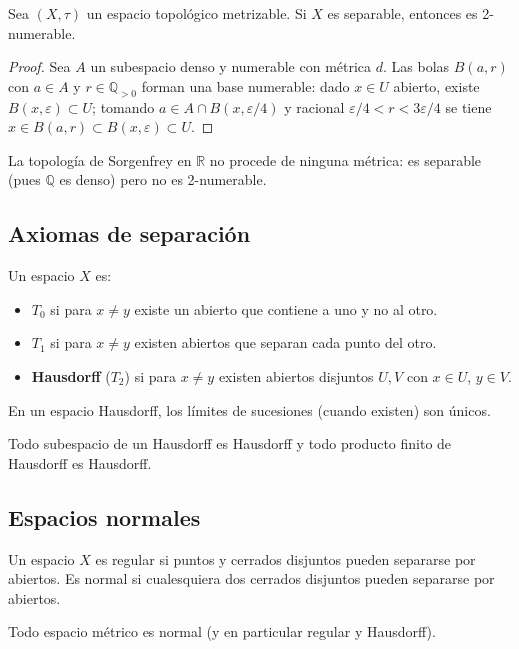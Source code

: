 \begin{proposición}
    Sea $(X, \tau)$ un espacio topológico metrizable. Si $X$ es separable, entonces es 2-numerable.
\end{proposición}
\begin{proof}
    Sea $A$ un subespacio denso y numerable con métrica $d$. Las bolas $B(a, r)$ con $a \in A$ y $r \in \mathbb{Q}_{>0}$ forman una base numerable: dado $x \in U$ abierto, existe $B(x, \varepsilon) \subset U$; tomando $a \in A \cap B(x, \varepsilon/4)$ y racional $\varepsilon/4 < r < 3\varepsilon/4$ se tiene $x \in B(a, r) \subset B(x, \varepsilon) \subset U$.
\end{proof}

\begin{corolario}
    La topología de Sorgenfrey en $\mathbb{R}$ no procede de ninguna métrica: es separable (pues $\mathbb{Q}$ es denso) pero no es 2-numerable.
\end{corolario}


\subsection{Axiomas de separación}

\begin{definición}[$T_0$, $T_1$, Hausdorff]
    Un espacio $X$ es:
    \begin{itemize}
        \item $T_0$ si para $x\neq y$ existe un abierto que contiene a uno y no al otro.
        \item $T_1$ si para $x\neq y$ existen abiertos que separan cada punto del otro.
        \item \textbf{Hausdorff} ($T_2$) si para $x\neq y$ existen abiertos disjuntos $U,V$ con $x\in U$, $y\in V$.
    \end{itemize}
\end{definición}

\begin{proposición}
    En un espacio Hausdorff, los límites de sucesiones (cuando existen) son únicos.
\end{proposición}

\begin{proposición}
    Todo subespacio de un Hausdorff es Hausdorff y todo producto finito de Hausdorff es Hausdorff.
\end{proposición}

\subsection{Espacios normales}

\begin{definición}
    Un espacio $X$ es regular si puntos y cerrados disjuntos pueden separarse por abiertos. Es normal si cualesquiera dos cerrados disjuntos pueden separarse por abiertos.
\end{definición}

\begin{proposición}
    Todo espacio métrico es normal (y en particular regular y Hausdorff).
\end{proposición}
